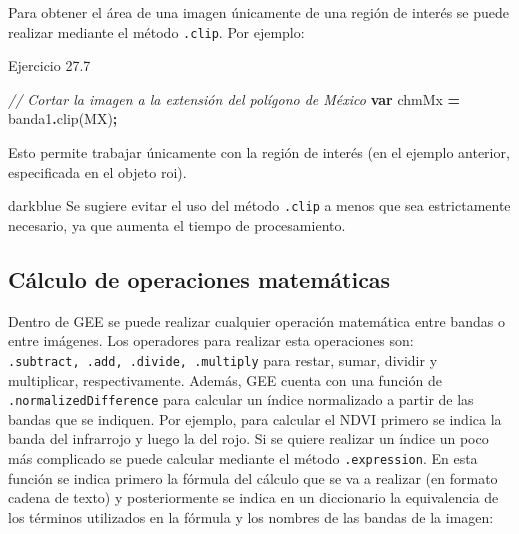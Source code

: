 \documentclass[
  12pt,
  letterpaper,
  twoside]{book}
\newenvironment{Shaded}{\begin{snugshade}}{\end{snugshade}}
\newcommand{\CommentTok}[1]{\textcolor[rgb]{0.56,0.35,0.01}{\textit{#1}}}
\newcommand{\FunctionTok}[1]{\textcolor[rgb]{0.00,0.00,0.00}{#1}}
\newcommand{\KeywordTok}[1]{\textcolor[rgb]{0.13,0.29,0.53}{\textbf{#1}}}
\newcommand{\NormalTok}[1]{#1}
\newcommand{\OperatorTok}[1]{\textcolor[rgb]{0.81,0.36,0.00}{\textbf{#1}}}
\begin{document}
Para obtener el área de una imagen únicamente de una región de interés se puede realizar mediante el método \texttt{.clip}. Por ejemplo:

Ejercicio 27.7

\begin{Shaded}
\begin{Highlighting}[]
\CommentTok{// Cortar la imagen a la extensión del polígono de México}
\KeywordTok{var}\NormalTok{ chmMx }\OperatorTok{=}\NormalTok{ banda1}\OperatorTok{.}\FunctionTok{clip}\NormalTok{(MX)}\OperatorTok{;}
\end{Highlighting}
\end{Shaded}

Esto permite trabajar únicamente con la región de interés (en el ejemplo anterior, especificada en el objeto roi).

\begin{bluebox2}

\begin{awesomeblock}{5pt}{\faLightbulb}{darkblue}
Se sugiere evitar el uso del método \texttt{.clip} a menos que sea estrictamente necesario, ya que aumenta el tiempo de procesamiento.

\end{awesomeblock}

\end{bluebox2}

\hypertarget{cuxe1lculo-de-operaciones-matemuxe1ticas}{%
\subsection{Cálculo de operaciones matemáticas}\label{cuxe1lculo-de-operaciones-matemuxe1ticas}}

Dentro de GEE se puede realizar cualquier operación matemática entre bandas o entre imágenes. Los operadores para realizar esta operaciones son: \texttt{.subtract,\ .add,\ .divide,\ .multiply} para restar, sumar, dividir y multiplicar, respectivamente. Además, GEE cuenta con una función de \texttt{.normalizedDifference} para calcular un índice normalizado a partir de las bandas que se indiquen. Por ejemplo, para calcular el NDVI primero se indica la banda del infrarrojo y luego la del rojo. Si se quiere realizar un índice un poco más complicado se puede calcular mediante el método \texttt{.expression}. En esta función se indica primero la fórmula del cálculo que se va a realizar (en formato cadena de texto) y posteriormente se indica en un diccionario la equivalencia de los términos utilizados en la fórmula y los nombres de las bandas de la imagen:
\end{document}
